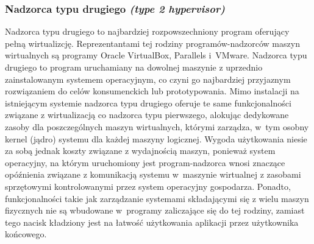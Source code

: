 \subsubsection{Nadzorca typu drugiego \textit{(type 2 hypervisor)}}
Nadzorca typu drugiego to najbardziej rozpowszechniony program oferujący pełną wirtualizcję. Reprezentantami tej rodziny programów-nadzorców maszyn wirtualnych są programy Oracle VirtualBox, Parallels i~VMware. Nadzorca typu drugiego to program uruchamiany na dowolnej maszynie z uprzednio zainstalowanym systemem operacyjnym, co czyni go najbardziej przyjaznym rozwiązaniem do celów konsumenckich lub prototypowania. Mimo instalacji na istniejącym systemie nadzorca typu drugiego oferuje te same funkcjonalności związane z wirtualizacją co nadzorca typu pierwszego, alokując dedykowane zasoby dla poszczególnych maszyn wirtualnych, którymi zarządza, w~tym osobny kernel (jądro) systemu dla każdej maszyny logicznej. Wygoda użytkowania niesie za sobą jednak koszty związane z wydajnością maszyn, ponieważ system operacyjny, na którym uruchomiony jest program-nadzorca wnosi znaczące opóźnienia związane z komunikacją systemu w~maszynie wirtualnej z zasobami sprzętowymi kontrolowanymi przez system operacyjny gospodarza. Ponadto, funkcjonalności takie jak zarządzanie systemami składającymi się z wielu maszyn fizycznych nie są wbudowane w~programy zaliczające się do tej rodziny, zamiast tego nacisk kładziony jest na łatwość użytkowania aplikacji przez użytkownika końcowego.

